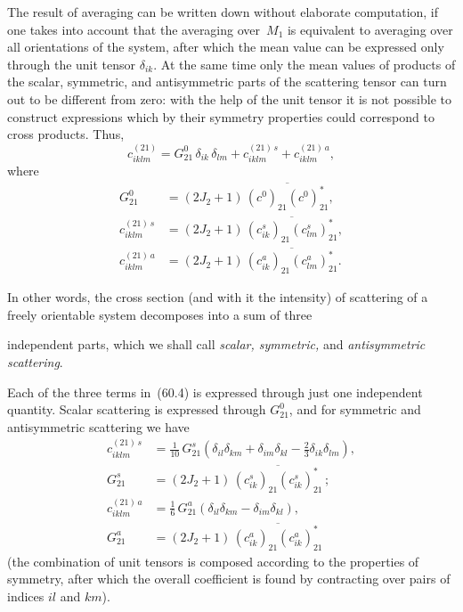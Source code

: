 The result of averaging can be written down without elaborate computation, if one takes into account that the averaging over~$M_1$ is equivalent to averaging over all orientations of the system, after which the mean value can be expressed only through the unit tensor $\delta_{ik}$. At the same time only the mean values of products of the scalar, symmetric, and antisymmetric parts of the scattering tensor can turn out to be different from zero: with the help of the unit tensor it is not possible to construct expressions which by their symmetry properties could correspond to cross products. Thus,
\begin{equation}
c^{(21)}_{iklm} = G^0_{21}\,\delta_{ik}\,\delta_{lm} + c^{(21)\,s}_{iklm} + c^{(21)\,a}_{iklm},
\tag{60.4}
\end{equation}
where
\begin{equation}
\begin{aligned}
G^0_{21} &= (2J_2 + 1)\,\overline{(c^0)_{21}(c^0)^*_{21}},\\[3pt]
c^{(21)\,s}_{iklm} &= (2J_2 + 1)\,\overline{(c^s_{ik})_{21}(c^s_{lm})^*_{21}},\\[3pt]
c^{(21)\,a}_{iklm} &= (2J_2 + 1)\,\overline{(c^a_{ik})_{21}(c^a_{lm})^*_{21}}.
\end{aligned}
\tag{60.5}
\end{equation}

In other words, the cross section (and with it the intensity) of scattering of a freely orientable system decomposes into a sum of three

independent parts, which we shall call \textit{scalar, symmetric,} and \textit{antisymmetric scattering}.

Each of the three terms in~(60.4) is expressed through just one independent quantity. Scalar scattering is expressed through $G^0_{21}$, and for symmetric and antisymmetric scattering we have
\begin{equation}
\begin{aligned}
c^{(21)\,s}_{iklm} &= \tfrac{1}{10}\,G^s_{21}(\delta_{il}\delta_{km} + \delta_{im}\delta_{kl} - \tfrac{2}{3}\delta_{ik}\delta_{lm}),\\[4pt]
G^s_{21} &= (2J_2 + 1)\,\overline{(c^s_{ik})_{21}(c^s_{ik})^*_{21}}\,;\\[6pt]
c^{(21)\,a}_{iklm} &= \tfrac{1}{6}\,G^a_{21}(\delta_{il}\delta_{km} - \delta_{im}\delta_{kl}),\\[4pt]
G^a_{21} &= (2J_2 + 1)\,\overline{(c^a_{ik})_{21}(c^a_{ik})^*_{21}}
\end{aligned}
\tag{60.6}
\end{equation}
(the combination of unit tensors is composed according to the properties of symmetry, after which the overall coefficient is found by contracting over pairs of indices $il$ and $km$).

